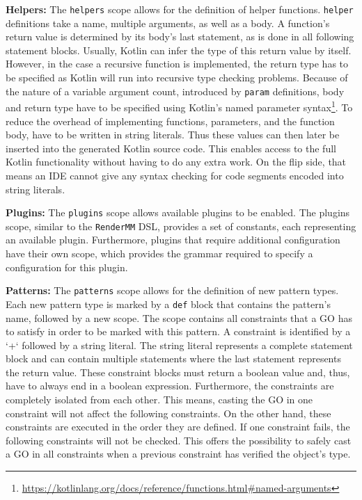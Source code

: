 \textbf{Helpers:} The \texttt{helpers} scope allows for the definition of helper functions. \texttt{helper} definitions take a name, multiple arguments, as well as a body. A function's return value is determined by its body's last statement, as is done in all following statement blocks. Usually, Kotlin can infer the type of this return value by itself. However, in the case a recursive function is implemented, the return type has to be specified as Kotlin will run into recursive type checking problems. Because of the nature of a variable argument count, introduced by \texttt{param} definitions, body and return type have to be specified using Kotlin's named parameter syntax\footnote{\url{https://kotlinlang.org/docs/reference/functions.html\#named-arguments}}. To reduce the overhead of implementing functions, parameters, and the function body, have to be written in string literals. Thus these values can then later be inserted into the generated Kotlin source code. This enables access to the full Kotlin functionality without having to do any extra work. On the flip side, that means an IDE cannot give any syntax checking for code segments encoded into string literals.

\textbf{Plugins:} The \texttt{plugins} scope allows available plugins to be enabled. The plugins scope, similar to the \texttt{RenderMM} DSL, provides a set of constants, each representing an available plugin. Furthermore, plugins that require additional configuration have their own scope, which provides the grammar required to specify a configuration for this plugin.

\textbf{Patterns:} The \texttt{patterns} scope allows for the definition of new pattern types. Each new pattern type is marked by a \texttt{def} block that contains the pattern's name, followed by a new scope. The scope contains all constraints that a GO has to satisfy in order to be marked with this pattern. A constraint is identified by a `+` followed by a string literal. The string literal represents a complete statement block and can contain multiple statements where the last statement represents the return value. These constraint blocks must return a boolean value and, thus, have to always end in a boolean expression. Furthermore, the constraints are completely isolated from each other. This means, casting the GO in one constraint will not affect the following constraints. On the other hand, these constraints are executed in the order they are defined. If one constraint fails, the following constraints will not be checked. This offers the possibility to safely cast a GO in all constraints when a previous constraint has verified the object's type.


